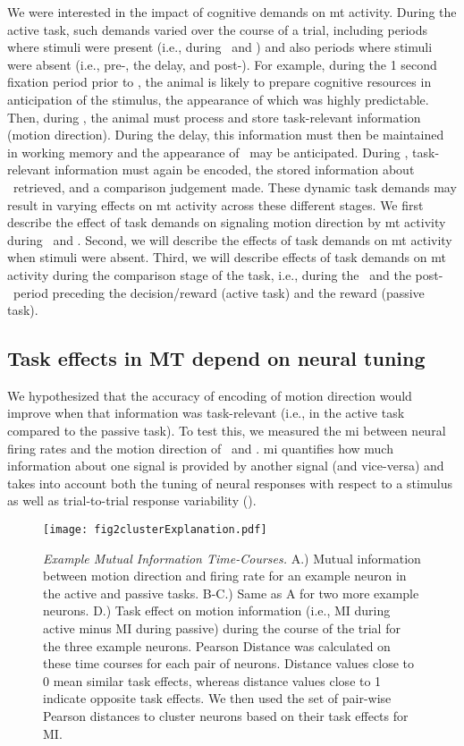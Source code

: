 We were interested in the impact of cognitive demands on \gls{mt} activity. During the active task, such demands varied over the course of a trial, including periods where stimuli were present (i.e., during \sample\ and \test) and also periods where stimuli were absent (i.e., pre-\sample, the delay, and post-\test). 
For example, during the 1 second fixation period prior to \sample, the animal is likely to prepare cognitive resources in anticipation of the stimulus, the appearance of which was highly predictable. Then, during \sample, the animal must process and store task-relevant information (motion direction). During the delay, this information must then be maintained in working memory and the appearance of \test\ may be anticipated. During \test, task-relevant information must again be encoded, the stored information about \sample\ retrieved, and a comparison judgement made. These dynamic task demands may result in varying effects on \gls{mt} activity across these different stages. We first describe the effect of task demands on signaling motion direction by \gls{mt} activity during \sample\ and \test. Second, we will describe the effects of task demands on \gls{mt} activity when stimuli were absent. 
Third, we will describe effects of task demands on \gls{mt} activity during the comparison stage of the task, i.e., during the \test\ and the post-\test\ period preceding the decision/reward (active task) and the reward (passive task).

\subsection*{Task effects in MT depend on neural tuning}
We hypothesized that the accuracy of encoding of motion direction would improve when that information was task-relevant (i.e., in the active task compared to the passive task).
To test this, we measured the \gls{mi} between neural firing rates and the motion direction of \sample\ and \test. \Gls{mi} quantifies how much information about one signal is provided by another signal (and vice-versa) and takes into account both the tuning of neural responses with respect to a stimulus as well as trial-to-trial response variability (\cite{Hatsopoulos1998, QuianQuiroga2009}).


	\begin{figure}
		\captionsetup{singlelinecheck = false, font=footnotesize, labelsep=space}
		\centering
		\texttt{[image: fig2clusterExplanation.pdf]}
		\caption{{\it Example Mutual Information Time-Courses.} A.) Mutual information between motion direction and firing rate for an example neuron in the active and passive tasks. B-C.) Same as A for two more example neurons. D.) Task effect on motion information (i.e., MI during active minus MI during passive) during the course of the trial for the three example neurons. Pearson Distance was calculated on these time courses for each pair of neurons. Distance values close to 0 mean similar task effects, whereas distance values close to 1 indicate opposite task effects. We then used the set of pair-wise Pearson distances to cluster neurons based on their task effects for MI.}
		\label{fig:clustering}
	\end{figure}



